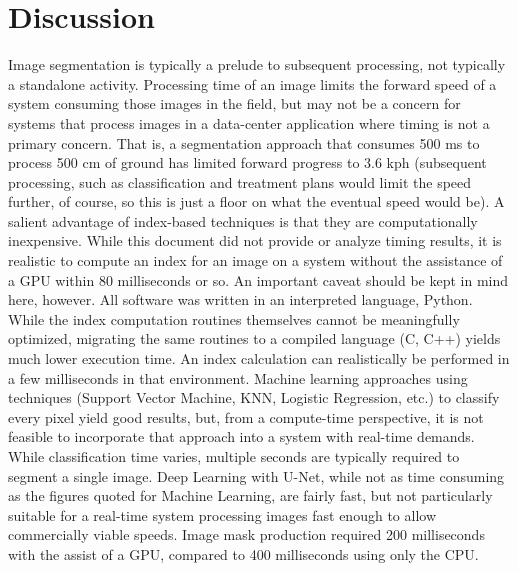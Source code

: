 \documentclass[agriculture,article,submit,pdftex,moreauthors]{Definitions/mdpi}
\begin{document}
% 
%
% 
%

\section{Discussion}
Image segmentation is typically a prelude to subsequent processing, not typically a standalone activity. Processing time of an image limits the forward speed of a system consuming those images in the field, but may not be a concern for systems that process images in a data-center application where timing is not a primary concern. That is, a segmentation approach that consumes 500 ms to process 500 cm of ground has limited forward progress to 3.6 kph (subsequent processing, such as classification and treatment plans would limit the speed further, of course, so this is just a floor on what the eventual speed would be). A salient advantage of index-based techniques is that they are computationally inexpensive. While this document did not provide or analyze timing results, it is realistic to compute an index for an image on a system without the assistance of a GPU within 80 milliseconds or so. An important caveat should be kept in mind here, however. All software was written in an interpreted language, Python. While the index computation routines themselves cannot be meaningfully optimized, migrating the same routines to a compiled language (C, C++) yields much lower execution time. An index calculation can realistically be performed in a few milliseconds in that environment. 
Machine learning approaches using techniques (Support Vector Machine, KNN, Logistic Regression, etc.) to classify every pixel yield good results, but, from a compute-time perspective, it is not feasible to incorporate that approach into a system with real-time demands. While classification time varies, multiple seconds are typically required to segment a single image. Deep Learning with U-Net, while not as time consuming as the figures quoted for Machine Learning, are fairly fast, but not particularly suitable for a real-time system processing images fast enough to allow commercially viable speeds. Image mask production required 200 milliseconds with the assist of a GPU, compared to 400 milliseconds using only the CPU. 
\end{document}
